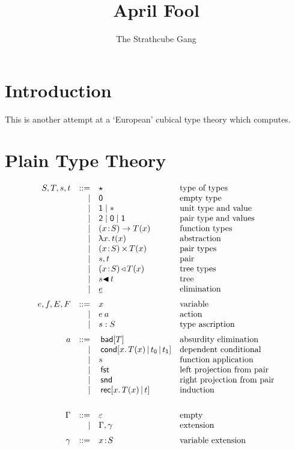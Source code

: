 \documentclass{article}
\newcommand{\hb}{\!:\!}
\newcommand{\TY}{\blue{\star}}
\newcommand{\ZERO}{\blue{\mathsf{0}}}
\newcommand{\ONE}{\blue{\mathsf{1}}}
\newcommand{\TWO}{\blue{\mathsf{2}}}
\newcommand{\PI}[2]{\blue{(}#1\hb #2\blue{)\to\;}}
\newcommand{\SG}[2]{\blue{(}#1\hb #2\blue{)\,\times\,}}
\newcommand{\WW}[2]{\blue{(}#1\hb #2\blue{)\,\triangleleft\,}}
\newcommand{\void}{\red{\ast}}
\newcommand{\ttt}{{\red{\mathsf{1}}}}
\newcommand{\fff}{{\red{\mathsf{0}}}}
\newcommand{\la}[1]{\red{\uplambda}#1.\,}
\newcommand{\pr}{\red{,}\,}
\newcommand{\tr}{\red{\blacktriangleleft}\,}
\newcommand{\el}[1]{\red{\underline{\black{#1}}}}
\newcommand{\fst}{\:\green{\mathsf{fst}}}
\newcommand{\snd}{\:\green{\mathsf{snd}}}
\newcommand{\bad}[1]{\:\green{\mathsf{bad}[}#1\green{]}}
\newcommand{\cond}[4]{\:\green{\mathsf{cond}[}#1.\,#2\green{\,\mid\,}#3\green{\,\mid\,}#4\green{]}}
\newcommand{\ind}[3]{\:\green{\mathsf{rec}[}#1.\,#2\green{\,\mid\,}#3\green{]}}
\begin{document}
\title{April Fool}
\author{The Strathcube Gang}
\maketitle

\section{Introduction}

This is another attempt at a `European' cubical type theory which computes.


\section{Plain Type Theory}

\[\begin{array}{rrll}
S,T,s,t & ::= & \TY   & \mbox{type of types} \\
        &   | & \ZERO & \mbox{empty type}\\
        &   | & \ONE  \;|\; \void & \mbox{unit type and value}\\
        &   | & \TWO \;|\; \fff \;|\; \ttt & \mbox{pair type and values} \\
        &   | & \PI x S T(x)   & \mbox{function types}\\
        &   | & \la x t(x)     & \mbox{abstraction}\\
        &   | & \SG x S T(x)   & \mbox{pair types}\\
        &   | & s \pr t        & \mbox{pair} \\
        &   | & \WW x S T(x)   & \mbox{tree types} \\
        &   | & s \tr t        & \mbox{tree} \\
        &   | & \el e          & \mbox{elimination}
\medskip\\
e,f,E,F & ::= & x              & \mbox{variable}\\
        &   | & e\:a           & \mbox{action}\\
        &   | & s:S            & \mbox{type ascription}
\medskip\\
a       & ::= & \bad T        & \mbox{absurdity elimination}\\
        &   | & \cond x{T(x)}{t_\fff}{t_\ttt}    & \mbox{dependent conditional}\\
        &   | & s           & \mbox{function application}\\
        &   | & \fst          & \mbox{left projection from pair}\\
        &   | & \snd          & \mbox{right projection from pair}\\
        &   | & \ind x{T(x)}t    & \mbox{induction}\\
\medskip\\
\Gamma & ::= & \varepsilon   & \mbox{empty} \\
       &   | & \Gamma,\gamma & \mbox{extension}
\medskip\\
\gamma & ::= & x\hb S & \mbox{variable extension} \\
\end{array}\]
\end{document}
